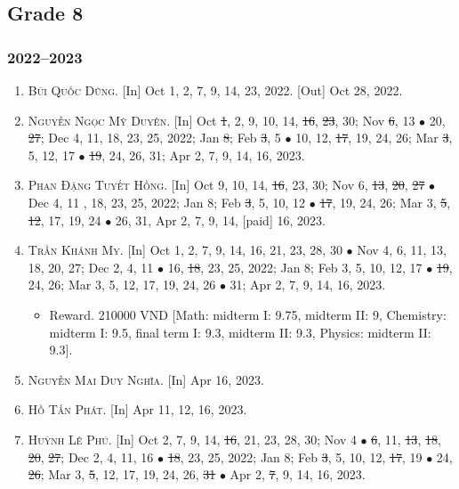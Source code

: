\documentclass{article}
\begin{document}
\subsection{Grade 8}

\subsubsection{2022--2023}

\begin{enumerate}
	\item \textsc{Bùi Quốc Dũng.} \textsf{[In]} Oct 1, 2, 7, 9, 14, 23, 2022. \textsf{[Out]} Oct 28, 2022.
	\item \textsc{Nguyễn Ngọc Mỹ Duyên.} \textsf{[In]} Oct \st{1}, 2, 9, 10, 14, \st{16}, \st{23}, 30; Nov \st{6}, 13 $\bullet$ 20, \st{27}; Dec 4, 11, 18, 23, 25, 2022; Jan \st{8}; Feb \st{3}, 5 $\bullet$ 10, 12, \st{17}, 19, 24, 26; Mar \st{3}, 5, 12, 17 $\bullet$ \st{19}, 24, 26, 31; Apr 2, 7, 9, 14, 16, 2023.
	\item \textsc{Phan Đặng Tuyết Hồng.} \textsf{[In]} Oct 9, 10, 14, \st{16}, 23, 30; Nov 6, \st{13}, \st{20}, \st{27} $\bullet$ Dec 4, 11 , 18, 23, 25, 2022; Jan 8; Feb \st{3}, 5, 10, 12 $\bullet$ \st{17}, 19, 24, 26; Mar 3, \st{5}, \st{12}, 17, 19, 24 $\bullet$ 26, 31, Apr 2, 7, 9, 14, [paid] 16, 2023.
	\item \textsc{Trần Khánh My.} \textsf{[In]} Oct 1, 2, 7, 9, 14, 16, 21, 23, 28, 30 $\bullet$ Nov 4, 6, 11, 13, 18, 20, 27; Dec 2, 4, 11 $\bullet$ 16, \st{18}, 23, 25, 2022; Jan 8; Feb 3, 5, 10, 12, 17 $\bullet$ \st{19}, 24, 26; Mar 3, 5, 12, 17, 19, 24, 26 $\bullet$ 31; Apr 2, 7, 9, 14, 16, 2023.
	\begin{itemize}
		\item \textsf{Reward.} 210000 VND [Math: midterm I: 9.75, midterm II: 9,  Chemistry: midterm I: 9.5, final term I: 9.3, midterm II: 9.3, Physics: midterm II: 9.3].
	\end{itemize}
	\item \textsc{Nguyễn Mai Duy Nghĩa.} \textsf{[In]} Apr 16, 2023.
	\item \textsc{Hồ Tấn Phát.} \textsf{[In]} Apr 11, 12, 16, 2023.
	\item \textsc{Huỳnh Lê Phú.} \textsf{[In]} Oct 2, 7, 9, 14, \st{16}, 21, 23, 28, 30; Nov 4 $\bullet$ \st{6}, 11, \st{13}, \st{18}, \st{20}, \st{27}; Dec 2, 4, 11, 16 $\bullet$ \st{18}, 23, 25, 2022; Jan 8; Feb \st{3}, 5, 10, 12, \st{17}, 19 $\bullet$ 24, \st{26}; Mar 3, \st{5}, 12, 17, 19, 24, 26, \st{31} $\bullet$ Apr 2, \st{7}, 9, 14, 16, 2023.

\end{enumerate}
\end{document}
